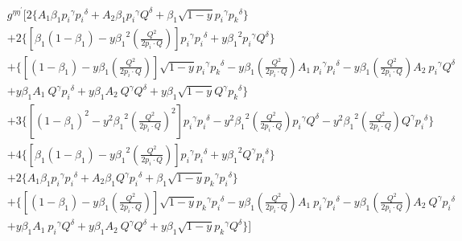 \begin{equation}
\begin{split} 
& g^{{{\eta}}{{\eta}^{\prime}}}[2\lbrace A_1\beta_1 {p_i}^{{\gamma}}{{p_i}^{{\delta}}}+A_2\beta_1 {p_i}^{{\gamma}}{{Q}^{{\delta}}}+\beta_1 \sqrt{1-y}{p_i}^{{\gamma}}{{p_k}^{{\delta}}} \rbrace \\&
+2\lbrace [\beta_1(1-\beta_1)-y {\beta_1}^2 (\frac{Q^2}{2p_i \cdot Q})] {p_i}^{{\gamma}}{p_i}^{{\delta}}+y {\beta_1}^2 {p_i}^{{\gamma}}{Q}^{{\delta}} \rbrace\\
&+\lbrace [(1-\beta_1)-y\beta_1 (\frac{Q^2}{2p_i \cdot Q})] \sqrt{1-y}{p_i}^{{\gamma}}{{p_k}^{{\delta}}}-y {\beta_1} (\frac{Q^2}{2p_i \cdot Q}) A_1 \:{p_i}^{{\gamma}}{p_i}^{{\delta}}
-y {\beta_1} (\frac{Q^2}{2p_i \cdot Q}) A_2\: {p_i}^{{\gamma}}{Q}^{{\delta}}\\
&+y {\beta_1} A_1 \:{Q}^{{\gamma}}{p_i}^{{\delta}}+y {\beta_1} A_2 \:{Q}^{{\gamma}}{Q}^{{\delta}}+y {\beta_1}\sqrt{1-y}{Q}^{{\gamma}}{{p_k}^{{\delta}}} \rbrace \\
&+3\lbrace [(1-\beta_1)^2-y^2 {\beta_1}^2 (\frac{Q^2}{2p_i \cdot Q})^2] {p_i}^{{\gamma}}{p_i}^{{\delta}}-y^2 {\beta_1}^2 (\frac{Q^2}{2p_i \cdot Q}){p_i}^{{\gamma}}{Q}^{{\delta}}-y^2 {\beta_1}^2 (\frac{Q^2}{2p_i \cdot Q}){Q}^{{\gamma}}{p_i}^{{\delta}} \rbrace\\
&+4\lbrace [\beta_1(1-\beta_1)-y {\beta_1}^2 (\frac{Q^2}{2p_i \cdot Q})] {p_i}^{{\gamma}}{p_i}^{{\delta}}+y {\beta_1}^2 {Q}^{{\gamma}}{p_i}^{{\delta}} \rbrace\\
&+2\lbrace A_1\beta_1 {p_i}^{{\gamma}}{{p_i}^{{\delta}}}+A_2\beta_1 {Q}^{{\gamma}}{{p_i}^{{\delta}}}+\beta_1 \sqrt{1-y}{p_k}^{{\gamma}}{{p_i}^{{\delta}}} \rbrace \\
&+\lbrace [(1-\beta_1)-y\beta_1 (\frac{Q^2}{2p_i \cdot Q})] \sqrt{1-y}{p_k}^{{\gamma}}{{p_i}^{{\delta}}}-y {\beta_1} (\frac{Q^2}{2p_i \cdot Q}) A_1 \:{p_i}^{{\gamma}}{p_i}^{{\delta}}
-y {\beta_1} (\frac{Q^2}{2p_i \cdot Q}) A_2\: {Q}^{{\gamma}}{p_i}^{{\delta}}\\
&+y {\beta_1} A_1 \:{p_i}^{{\gamma}}{Q}^{{\delta}}+y {\beta_1} A_2 \:{Q}^{{\gamma}}{Q}^{{\delta}}+y {\beta_1}\sqrt{1-y}{p_k}^{{\gamma}}{{Q}^{{\delta}}} \rbrace]\\
\end{split}
\end{equation}


